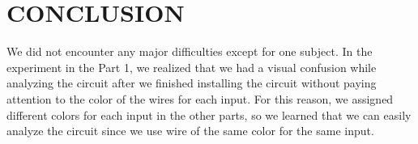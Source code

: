 \documentclass[pdftex,12pt,a4paper]{article}
\begin{document}
\section{CONCLUSION}
We did not encounter any major difficulties except for one subject. In the experiment in the Part 1, we realized that we had a visual confusion while analyzing the circuit after we finished installing the circuit without paying attention to the color of the wires for each input. For this reason, we assigned  different colors for each input in the other parts, so we learned that we can easily analyze the circuit since we use wire of the same color for the same input.
\begin{flushleft}
\paragraph{}


\end{flushleft}



\newpage
{}
\nocite{ref1}
\nocite{report_guide}
\nocite{beginner_overleaf}



\end{document}
